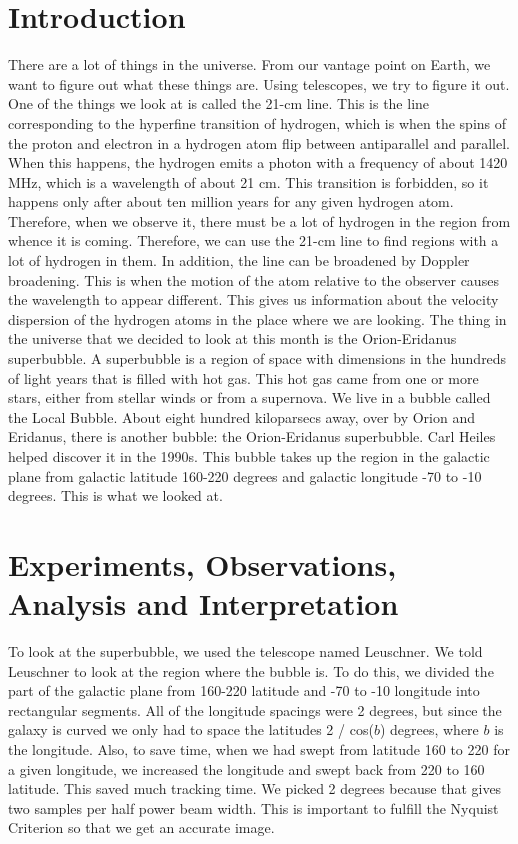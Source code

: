\documentclass[11pt]{article}
\begin{document}
\section{Introduction}
There are a lot of things in the universe. From our vantage point on Earth, we want to figure out what these things are. Using telescopes, we try to figure it out. One of the things we look at is called the 21-cm line. This is the line corresponding to the hyperfine transition of hydrogen, which is when the spins of the proton and electron in a hydrogen atom flip between antiparallel and parallel. When this happens, the hydrogen emits a photon with a frequency of about 1420 MHz, which is a wavelength of about 21 cm. This transition is forbidden, so it happens only after about ten million years for any given hydrogen atom. Therefore, when we observe it, there must be a lot of hydrogen in the region from whence it is coming. Therefore, we can use the 21-cm line to find regions with a lot of hydrogen in them. In addition, the line can be broadened by Doppler broadening. This is when the motion of the atom relative to the observer causes the wavelength to appear different. This gives us information about the velocity dispersion of the hydrogen atoms in the place where we are looking. 
The thing in the universe that we decided to look at this month is the Orion-Eridanus superbubble. A superbubble is a region of space with dimensions in the hundreds of light years that is filled with hot gas. This hot gas came from one or more stars, either from stellar winds or from a supernova. We live in a bubble called the Local Bubble. About eight hundred kiloparsecs away, over by Orion and Eridanus, there is another bubble: the Orion-Eridanus superbubble. Carl Heiles helped discover it in the 1990s. This bubble takes up the region in the galactic plane from galactic latitude 160-220 degrees and galactic longitude -70 to -10 degrees. This is what we looked at.  

\section{Experiments, Observations, Analysis and Interpretation} 
To look at the superbubble, we used the telescope named Leuschner. We told Leuschner to look at the region where the bubble is. To do this, we divided the part of the galactic plane from 160-220 latitude and -70 to -10 longitude into rectangular segments. All of the longitude spacings were 2 degrees, but since the galaxy is curved we only had to space the latitudes 2 / cos($b$) degrees, where $b$ is the longitude. Also, to save time, when we had swept from latitude 160 to 220 for a given longitude, we increased the longitude and swept back from 220 to 160 latitude. This saved much tracking time. We picked 2 degrees because that gives two samples per half power beam width. This is important to fulfill the Nyquist Criterion so that we get an accurate image. 
\end{document}
